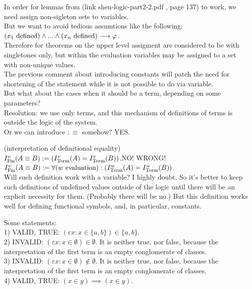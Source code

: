 In order for lemmas from (link shen-logic-part2-2.pdf , page 137) to work, we need assign non-sigleton sets to variables.\\
But we want to avoid tedious assumtions like the following:
$(x_1\mathrm{\ defined})\land...\land(x_n\mathrm{\ defined})\longrightarrow \varphi$.\\
Therefore for theorems on the upper level assigment are considered to be with singletones only, but within the evaluation variables may be assigned to a set with non-unique values.\\
The previous comment about introducing constants will patch the need for shortening of the statement while it is not possible to do via variable.\\
But what about the cases when it should be a term, depending on some parameters?\\
Resolution: we use only terms, and this mechanism of definitions of terms is outside the logic of the system.\\
Or we can introduce $:\equiv$ somehow? YES.\\%

\begin{definition}(interpretation of definitional equality)\\
\st{$I^v_{\mathrm{Fm}}(A\equiv B):=(I^v_{\mathrm{Term}}(A) = I^v_{\mathrm{Term}}(B))$}.NO! WRONG!\\
$I^v_\Fm(A\equiv B):=\forall(w\ \mbox{evaluation}):(I^w_\Term(A) = I^w_\Term(B))$.\\
Will such definition work with a variable? I highly doubt. 
So it's better to keep such definitions of undefined values outside of the logic until there will be an explicit necessity for them. (Probably there will be no.)
But this definition works well for defining functional symbols, and, in particular, constants.
\end{definition}

Some statements:\\
1) VALID, TRUE: $(\varepsilon x: x \in \{a,b\})\in \{a,b\}$.\\
2) INVALID: $(\varepsilon x: x \in \emptyset) \in \emptyset$. It is neither true, nor false, because the interpretation of the first term is an empty conglomerate of classes.\\
3) INVALID: $(\varepsilon x: x \in \emptyset) \notin \emptyset$. It is neither true, nor false, because the interpretation of the first term is an empty conglomerate of classes.\\
4) VALID, TRUE: $(x\in y) \implies (x\in y)$.


